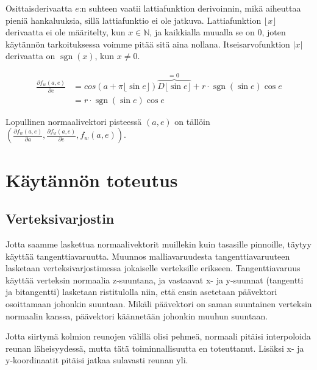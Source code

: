 \documentclass[utf8,bachelor]{gradu3}
\DeclareMathOperator{\sgn}{sgn}
\begin{document}
Osittaisderivaatta $e$:n suhteen vaatii lattiafunktion derivoinnin, mikä aiheuttaa pieniä hankaluuksia, sillä lattiafunktio ei ole jatkuva. Lattiafunktion $\lfloor x \rfloor $ derivaatta ei ole määritelty, kun $ x \in \mathbb{N}$, ja kaikkialla muualla se on $0$, joten käytännön tarkoituksessa voimme pitää sitä aina nollana. Itseisarvofunktion $\lvert x \rvert$ derivaatta on $\sgn(x)$, kun $x \neq 0$.

\begin{equation}
\label{eq:partialE}
\begin{aligned}
\frac{\partial f_w(a,e)}{\partial e} & = cos(a + \pi\lfloor \sin{e} \rfloor )  \overbrace{ D \lfloor \sin{e} \rfloor }^\text{= 0} + r \cdot \sgn ( \sin e )\cos e \\
& = r \cdot \sgn ( \sin e )\cos e
\end{aligned}
\end{equation}

Lopullinen normaalivektori pisteessä $(a,e)$ on tällöin $(\frac{\partial f_w(a,e)}{\partial a}, \frac{\partial f_w(a,e)}{\partial e}, f_w(a,e))$.

\chapter{Käytännön toteutus}

\section{Verteksivarjostin}

Jotta saamme laskettua normaalivektorit muillekin kuin tasasille pinnoille, täytyy käyttää tangenttiavaruutta. Muunnos malliavaruudesta tangenttiavaruuteen lasketaan verteksivarjostimessa jokaiselle verteksille erikseen. Tangenttiavaruus käyttää verteksin normaalia z-suuntana, ja vastaavat x- ja y-suunnat (tangentti ja bitangentti) lasketaan ristitulolla niin, että ensin asetetaan päävektori osoittamaan johonkin suuntaan. Mikäli päävektori on saman suuntainen verteksin normaalin kanssa, päävektori käännetään johonkin muuhun suuntaan.


Jotta siirtymä kolmion reunojen välillä olisi pehmeä, normaali pitäisi interpoloida reunan läheisyydessä, mutta tätä toiminnallisuutta en toteuttanut. Lisäksi x- ja y-koordinaatit pitäisi jatkaa sulavasti reunan yli.
\end{document}
